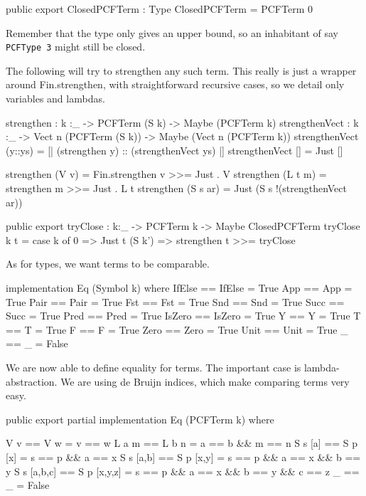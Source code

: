 \begin{code}
public export
ClosedPCFTerm : Type
ClosedPCFTerm = PCFTerm 0
\end{code}

Remember that the type only gives an upper bound, so an inhabitant of say
\lstinline{PCFType 3} might still be closed.

The following will try to strengthen any such term. This really is just a
wrapper around Fin.strengthen, with straightforward recursive cases,
so we detail only variables and lambdas.   %

\begin{code}
strengthen : {k :_} -> PCFTerm (S k) -> Maybe (PCFTerm k)
strengthenVect : {k :_} -> Vect n (PCFTerm (S k)) -> Maybe (Vect n (PCFTerm k))
strengthenVect (y::ys) = [| (strengthen y) :: (strengthenVect ys) |]
strengthenVect [] = Just []
\end{code}


\begin{code}
strengthen (V v)    = Fin.strengthen v >>= Just . V
strengthen (L t m)  = strengthen m     >>= Just . L t
strengthen (S s ar) = Just (S s !(strengthenVect ar))
\end{code}

\begin{code}
public export
tryClose : {k:_} -> PCFTerm k -> Maybe ClosedPCFTerm
tryClose {k} t = case k of
                 0      => Just t
                 (S k') => strengthen t >>= tryClose
\end{code}

As for types, we want terms to be comparable.

\begin{hidden}
implementation Eq (Symbol k) where
  IfElse == IfElse = True
  App    == App    = True
  Pair   == Pair   = True
  Fst    == Fst    = True
  Snd    == Snd    = True
  Succ   == Succ   = True
  Pred   == Pred   = True
  IsZero == IsZero = True
  Y      == Y      = True
  T      == T      = True
  F      == F      = True
  Zero   == Zero   = True
  Unit   == Unit   = True
  _      == _      = False
\end{hidden}

We are now able to define equality for terms. The important case is
lambda-abstraction. We are using de Bruijn indices, which make comparing terms
very easy.

\begin{code}
public export partial
implementation Eq (PCFTerm k) where

  V v         == V w          = v == w
  L a m       == L b n        = a == b && m == n
  S s [a]     == S p [x]      = s == p && a == x
  S s [a,b]   == S p [x,y]    = s == p && a == x && b == y
  S s [a,b,c] == S p [x,y,z]  = s == p && a == x && b == y && c == z
  _           == _            = False
\end{code}

